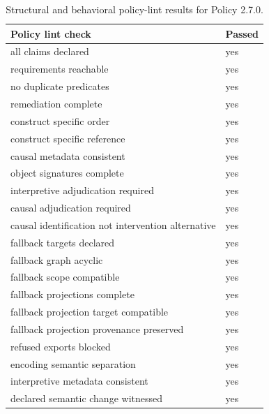 \begin{table}[t]
  \caption{Structural and behavioral policy-lint results for Policy 2.7.0.}
  \label{tab:policy-lint}
  \centering
  \small
  \begin{tabular}{ll}
    \toprule
    Policy lint check & Passed \\
    \midrule
    all claims declared & yes \\
    requirements reachable & yes \\
    no duplicate predicates & yes \\
    remediation complete & yes \\
    construct specific order & yes \\
    construct specific reference & yes \\
    causal metadata consistent & yes \\
    object signatures complete & yes \\
    interpretive adjudication required & yes \\
    causal adjudication required & yes \\
    causal identification not intervention alternative & yes \\
    fallback targets declared & yes \\
    fallback graph acyclic & yes \\
    fallback scope compatible & yes \\
    fallback projections complete & yes \\
    fallback projection target compatible & yes \\
    fallback projection provenance preserved & yes \\
    refused exports blocked & yes \\
    encoding semantic separation & yes \\
    interpretive metadata consistent & yes \\
    declared semantic change witnessed & yes \\
    \bottomrule
  \end{tabular}
\end{table}
